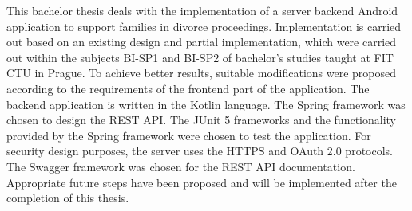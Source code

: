 This bachelor thesis deals with the implementation of a server backend Android application to support families in divorce proceedings. Implementation is carried out based on an existing design and partial implementation, which were carried out within the subjects BI-SP1 and BI-SP2 of bachelor's studies taught at FIT CTU in Prague. To achieve better results, suitable modifications were proposed according to the requirements of the frontend part of the application. The backend application is written in the Kotlin language. The Spring framework was chosen to design the REST API. The JUnit 5 frameworks and the functionality provided by the Spring framework were chosen to test the application. For security design purposes, the server uses the HTTPS and OAuth 2.0 protocols. The Swagger framework was chosen for the REST API documentation. Appropriate future steps have been proposed and will be implemented after the completion of this thesis.